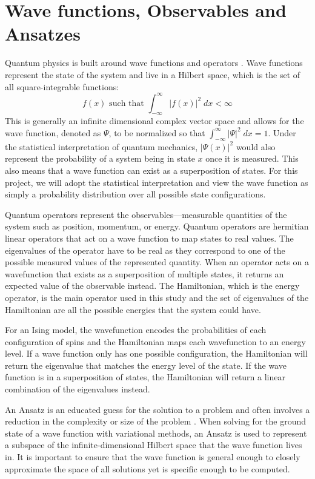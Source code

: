\section{Wave functions, Observables and Ansatzes}\label{wavefunction}
Quantum physics is built around wave functions and operators \cite{GriffithsSchroeter2018}. Wave functions represent the state of the system and live in a Hilbert space, which is the set of all square-integrable functions:
\begin{equation*}
    f(x) \text{ such that } \int_{-\infty}^\infty |f(x)|^2 \; dx < \infty
\end{equation*}
This is generally an infinite dimensional complex vector space and allows for the wave function, denoted as $\Psi$, to be normalized so that $\int_{-\infty}^\infty |\Psi|^2 \; dx = 1$. Under the statistical interpretation of quantum mechanics, $|\Psi(x)|^2$ would also represent the probability of a system being in state $x$ once it is measured. This also means that a wave function can exist as a superposition of states. For this project, we will adopt the statistical interpretation and view the wave function as simply a probability distribution over all possible state configurations.

Quantum operators represent the observables---measurable quantities of the system such as position, momentum, or energy. Quantum operators are hermitian linear operators that act on a wave function to map states to real values. The eigenvalues of the operator have to be real as they correspond to one of the possible measured values of the represented quantity. When an operator acts on a wavefunction that exists as a superposition of multiple states, it returns an expected value of the observable instead. The Hamiltonian, which is the energy operator, is the main operator used in this study and the set of eigenvalues of the Hamiltonian are all the possible energies that the system could have. 

For an Ising model, the wavefunction encodes the probabilities of each configuration of spins and the Hamiltonian maps each wavefunction to an energy level. If a wave function only has one possible configuration, the Hamiltonian will return the eigenvalue that matches the energy level of the state. If the wave function is in a superposition of states, the Hamiltonian will return a linear combination of the eigenvalues instead.

An Ansatz is an educated guess for the solution to a problem and often involves a reduction in the complexity or size of the problem \cite{qaoareview}. When solving for the ground state of a wave function with variational methods, an Ansatz is used to represent a subspace of the infinite-dimensional Hilbert space that the wave function lives in. It is important to ensure that the wave function is general enough to closely approximate the space of all solutions yet is specific enough to be computed.


